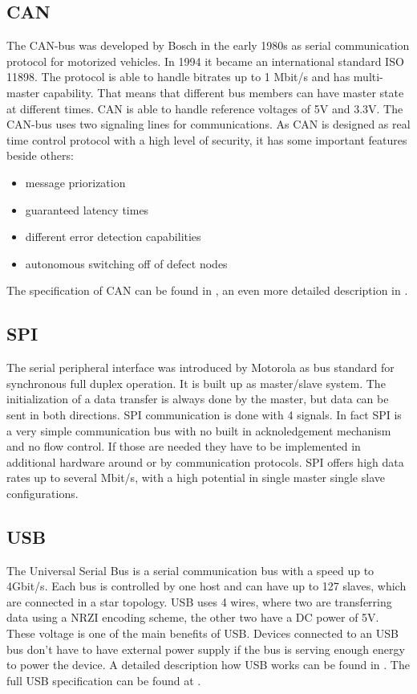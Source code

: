 \subsection{CAN}
The CAN-bus was developed by Bosch in the early 1980s as serial communication protocol for motorized vehicles. In 1994 it became an international standard ISO 11898. The protocol is able to handle bitrates up to 1 Mbit/s and has multi-master capability. That means that different bus members can have master state at different times. CAN is able to handle reference voltages of 5V and 3.3V.\cite{Corrig2008} The CAN-bus uses two signaling lines for communications. As CAN is designed as real time control protocol with a high level of security, it has some important features beside others\cite{boschcan91}:
\begin{itemize}
\item message priorization
\item guaranteed latency times
\item different error detection capabilities
\item autonomous switching off of defect nodes
\end{itemize}
The specification of CAN can be found in \cite{boschcan91}, an even more detailed description in \cite{nxpcan98}.
\subsection {SPI}
The serial peripheral interface was introduced by Motorola as bus standard for synchronous full duplex operation. It is built up as master/slave system. The initialization of a data transfer is always done by the master, but data can be sent in both directions. SPI communication is done with 4 signals. In fact SPI is a very simple communication bus with no built in acknoledgement mechanism and no flow control. If those are needed they have to be implemented in additional hardware around or by communication protocols. SPI offers high data rates up to several Mbit/s, with a high potential in single master single slave configurations.\cite{SPI02}
\subsection{USB}
The Universal Serial Bus is a serial communication bus with a speed up to 4Gbit/s. Each bus is controlled by one host and can have up to 127 slaves, which are connected in a star topology. USB uses 4 wires, where two are transferring data using a NRZI encoding scheme, the other two have a DC power of 5V. These voltage is one of the main benefits of USB. Devices connected to an USB bus don't have to have external power supply if the bus is serving enough energy to power the device. A detailed description how USB works can be found in \cite{Pea10}. The full USB specification can be found at \cite{USB16}.
